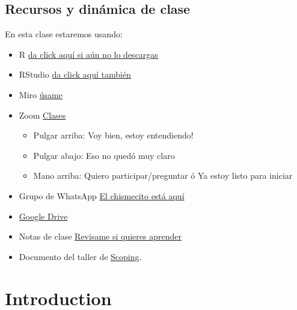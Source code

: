 \documentclass[
]{book}
\providecommand{\tightlist}{%
  \setlength{\itemsep}{0pt}\setlength{\parskip}{0pt}}
\begin{document}
\hypertarget{recursos-y-dinuxe1mica-de-clase}{%
\section{Recursos y dinámica de clase}\label{recursos-y-dinuxe1mica-de-clase}}

En esta clase estaremos usando:

\begin{itemize}
\tightlist
\item
  R \href{https://cran.r-project.org/}{da click aquí si aún no lo descargas}
\item
  RStudio \href{https://www.rstudio.com/products/rstudio/download/}{da click aquí también}
\item
  Miro \href{https://miro.com/welcomeonboard/c3huendzNURhRUVGbHlsWGVFYlBBMXRaSncybXRrbjBRU2R5WWg2eDFKUXY1VlJ1SGJFdmc4ZmRuWEgwcllpenwzMDc0NDU3MzYxMzQwNDIyODEy?invite_link_id=152058640259}{úsame}
\item
  Zoom \href{https://us02web.zoom.us/j/5155440751?pwd=YzJCOGF0VnlZdlZlS0Fpc3MvZEhadz09}{Clases}

  \begin{itemize}
  \tightlist
  \item
    Pulgar arriba: Voy bien, estoy entendiendo!
  \item
    Pulgar abajo: Eso no quedó muy claro
  \item
    Mano arriba: Quiero participar/preguntar ó Ya estoy listo para iniciar
  \end{itemize}
\item
  Grupo de WhatsApp \href{https://chat.whatsapp.com/KUbqIk8Cqu42zkXffIgUQQ}{El chismecito está aquí}
\item
  \href{https://drive.google.com/drive/folders/1IblKYfDpSjV89FBT3c-PafOiD4wW7UrD?usp=sharing}{Google Drive}
\item
  Notas de clase \href{KaLizzyGam.github.io/index.html}{Revisame si quieres aprender}
\item
  Documento del taller de \href{https://docs.google.com/spreadsheets/d/1hCRt00nYyZvbkfi9yOMRSR0R30lPRtKzaNKKlgAE78M/edit?usp=sharing}{Scoping}.
\end{itemize}

\hypertarget{intro}{%
\chapter{Introduction}\label{intro}}

  
\end{document}
